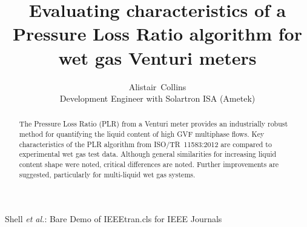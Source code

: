 \documentclass[journal]{IEEEtran}
\begin{document}
%
\title{Evaluating characteristics of a Pressure Loss Ratio algorithm for wet gas Venturi meters
}
%
%
%

\author{Alistair~Collins\\
Development Engineer with Solartron ISA (Ametek)
}


%
{Shell \MakeLowercase{\textit{et al.}}: Bare Demo of IEEEtran.cls for IEEE Journals}
% 











\maketitle

\begin{abstract}
The Pressure Loss Ratio (PLR) from a Venturi meter provides an industrially robust method for quantifying the liquid content of high GVF multiphase flows. Key characteristics of the PLR algorithm from ISO/TR~11583:2012 are compared to experimental wet gas test data. Although general similarities for increasing liquid content shape were noted, critical differences are noted. Further improvements are suggested, particularly for multi-liquid wet gas systems.
\end{abstract}
\end{document}

